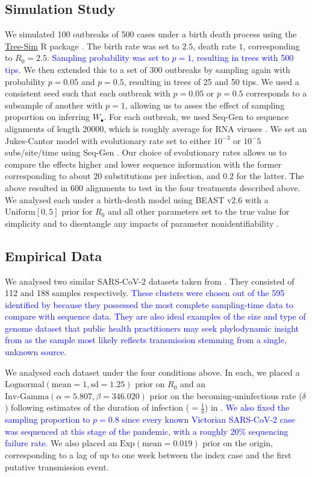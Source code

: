 \documentclass{article}
\begin{document}
\subsection*{Simulation Study}
We simulated 100 outbreaks of 500 cases under a birth death process using the \url{Tree-Sim} R package \citep{TreeSim}. The birth rate was set to $2.5$, death rate $1$, corresponding to $R_{0} = 2.5$. \textcolor{blue}{Sampling probability was set to $p=1$, resulting in trees with 500 tips.} We then extended this to a set of 300 outbreaks by sampling again with probability $p=0.05$ and $p = 0.5$, resulting in trees of 25 and 50 tips. We used a consistent seed such that each outbreak with $p=0.05$ or $p=0.5$ corresponds to a subsample of another with $p=1$, allowing us to asses the effect of sampling proportion on inferring $W_{\bullet}$. For each outbreak, we used Seq-Gen to sequence alignments of length 20000, which is roughly average for RNA viruses \citep{sanjuan2010viral,rambaut_seq-gen_1997}. We set an Jukes-Cantor model with evolutionary rate set to either $10^{-3}$ or $10^-{5}$ subs/site/time using Seq-Gen \cite{rambaut_seq-gen_1997}.  Our choice of evolutionary rates allows us to compare the effects higher and lower sequence information with the former corresponding to about 20 substitutions per infection, and 0.2 for the latter. 
The above resulted in 600 alignments to test in the four treatments described above. We analysed each under a birth-death model using BEAST v2.6 \citet{bouckaert_beast_2019} with a $\textrm{Uniform}[0,5]$ prior for $R_0$ and all other parameters set to the true value for simplicity and to disentangle any impacts of parameter nonidentifiability \citep{louca2021fundamental}.

\subsection*{Empirical Data}
We analysed two similar SARS-CoV-2 datasets taken from \citet{lane2021genomics}. They consisted of 112 and 188 samples respectively. \textcolor{blue}{These clusters were chosen out of the 595 identified by \citet{lane2021genomics} because they possessed the most complete sampling-time data to compare with sequence data. They are also ideal examples of the size and type of genome dataset that public health practitioners may seek phylodynamic insight from as the sample most likely reflects transmission stemming from a single, unknown source.} 

We analysed  each dataset under the four conditions above. In each, we placed a $\textrm{Lognormal}(\textrm{mean}=1, \textrm{sd}=1.25)$ prior on $R_0$ and an $\textrm{Inv-Gamma}(\alpha=5.807, \beta=346.020)$ prior on the becoming-uninfectious rate ($\delta$) following estimates of the duration of infection ($=\frac{1}{\delta}$) in \cite{Lauer2020The}. \textcolor{blue}{We also fixed the sampling proportion to $p=0.8$ since every known Victorian SARS-CoV-2 case was sequenced at this stage of the pandemic, with a roughly 20\% sequencing failure rate.} We also placed an $\textrm{Exp}(\textrm{mean}=0.019)$ prior on the origin, corresponding to a lag of up to one week  between the index case and the first putative transmission event.
\end{document}
